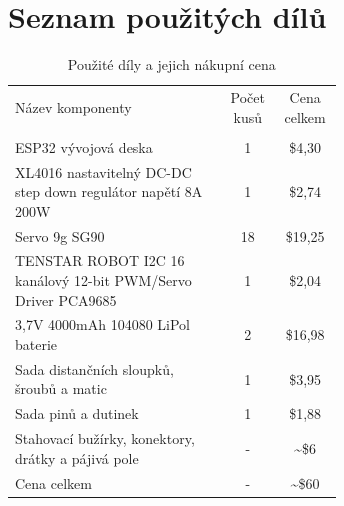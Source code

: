 




\chapter{Seznam použitých dílů}
\label{usedparts}

\begin{table}[hbt]
\centering
\caption{Použité díly a jejich nákupní cena}
\begin{tabular}{| p{0.65\linewidth}|c|c|}
\hline
Název komponenty & Počet kusů & Cena celkem \\ & & \\ \hline
ESP32 vývojová deska  & 1 & \$4,30 \\ \hline
XL4016 nastavitelný DC-DC step down regulátor napětí 8A 200W & 1 & \$2,74 \\ \hline
Servo 9g SG90 & 18 & \$19,25 \\ \hline
TENSTAR ROBOT I2C 16 kanálový 12-bit PWM/Servo Driver PCA9685 & 1 & \$2,04 \\ \hline
3,7V 4000mAh 104080 LiPol baterie & 2 & \$16,98 \\ \hline
Sada distančních sloupků, šroubů a matic & 1 & \$3,95 \\ \hline
Sada pinů a dutinek & 1 & \$1,88 \\ \hline
Stahovací bužírky, konektory, drátky a pájivá pole & \-- & \textasciitilde\$6 \\ \hline
Cena celkem & \-- & \textasciitilde\$60 \\ \hline
\end{tabular}
\end{table}


